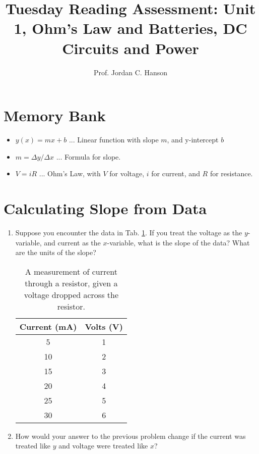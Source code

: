 \documentclass{article}
\begin{document}
\title{Tuesday Reading Assessment: Unit 1, Ohm's Law and Batteries, DC Circuits and Power}
\author{Prof. Jordan C. Hanson}

\maketitle

\section{Memory Bank}

\begin{itemize}
\item $y(x) = mx + b$ ... Linear function with slope $m$, and y-intercept $b$
\item $m = \Delta y / \Delta x$ ... Formula for slope.
\item $V = i R$ ... Ohm's Law, with $V$ for voltage, $i$ for current, and $R$ for resistance.
\end{itemize}

\section{Calculating Slope from Data}

\begin{enumerate}
\item Suppose you encounter the data in Tab. \ref{tab:t}.  If you treat the voltage as the $y$-variable, and current as the $x$-variable, what is the slope of the data?  What are the units of the slope? \\ \vspace{2cm}
\begin{table}[ht]
\centering
\begin{tabular}{| c | c |}
\hline
Current (mA) & Volts (V) \\ \hline
5 & 1 \\
10 & 2 \\
15 & 3 \\
20 & 4 \\
25 & 5 \\
30 & 6 \\ \hline
\end{tabular}
\caption{\label{tab:t} A measurement of current through a resistor, given a voltage dropped across the resistor.}
\end{table}
\item How would your answer to the previous problem change if the current was treated like $y$ and voltage were treated like $x$?
\end{enumerate}
\end{document}

